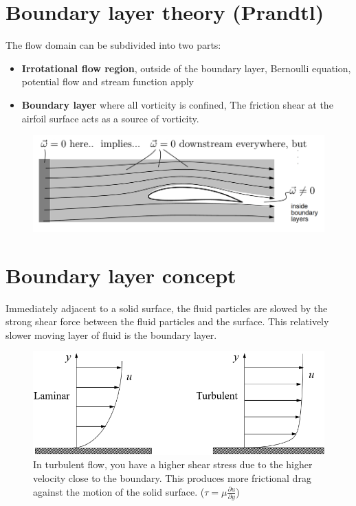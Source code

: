 \documentclass[class=report, crop=false, 12pt,a4paper]{standalone}
\begin{document}
\section*{Boundary layer theory (Prandtl)}
The flow domain can be subdivided into two parts:
\begin{itemize}
  \item \textbf{Irrotational flow region}, outside of the boundary layer, Bernoulli equation, potential flow and stream function apply
  \item \textbf{Boundary layer} where all vorticity is confined, The friction shear at the airfoil surface acts as a source of vorticity. 
\end{itemize}
\begin{figure}[H]
  \centering
  \includegraphics[width = 0.8 \textwidth]{../img/diagram48.png}
\end{figure}
\section{Boundary layer concept}
Immediately adjacent to a solid surface, the fluid particles are slowed by the strong shear force between the fluid particles and the surface. This relatively slower moving layer of fluid is the boundary layer.
\begin{figure}[H]
  \centering
  \includegraphics[width = 0.8 \textwidth]{../img/diagram49.png}
  \caption{In turbulent flow, you have a higher shear stress due to the higher velocity close to the boundary. This produces more frictional drag against the motion of the solid surface. ($\tau = \mu \frac{\partial u}{\partial y}$)}
\end{figure}
\end{document}
